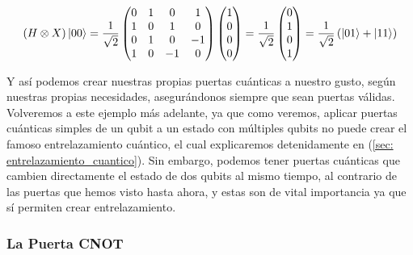 \documentclass{article}
\numberwithin{equation}{section} %
\begin{document}
    \begin{equation*}
        \left( H \otimes X \right) \ket{0 0} =  \frac{1}{\sqrt{2}} \begin{pmatrix}
            0 & 1 & 0 & 1 \\
            1 & 0 & 1 & 0 \\
            0 & 1 & 0 & -1 \\
            1 & 0 & -1 & 0
        \end{pmatrix} \begin{pmatrix}
            1 \\
            0 \\
            0 \\
            0
        \end{pmatrix} = \frac{1}{\sqrt{2}} \begin{pmatrix}
            0 \\ 
            1 \\
            0 \\
            1
        \end{pmatrix} = \frac{1}{\sqrt{2}} \left( \ket{0 1} + \ket{1 1} \right)
    \end{equation*}

    \vspace{2.5mm}

    Y así podemos crear nuestras propias puertas cuánticas a nuestro gusto, según nuestras propias necesidades, asegurándonos siempre que sean puertas válidas. Volveremos a este ejemplo más adelante, ya que como veremos, aplicar puertas cuánticas simples de un qubit a un estado con múltiples qubits no puede crear el famoso entrelazamiento cuántico, el cual explicaremos detenidamente en (\ref{sec: entrelazamiento_cuantico}). Sin embargo, podemos tener puertas cuánticas que cambien directamente el estado de dos qubits al mismo tiempo, al contrario de las puertas que hemos visto hasta ahora, y estas son de vital importancia ya que sí permiten crear entrelazamiento. 

    \vspace{5mm}





    \subsubsection{La Puerta CNOT}\label{subsubsection: la_puerta_cnot}

    \vspace{5mm}
\end{document}
